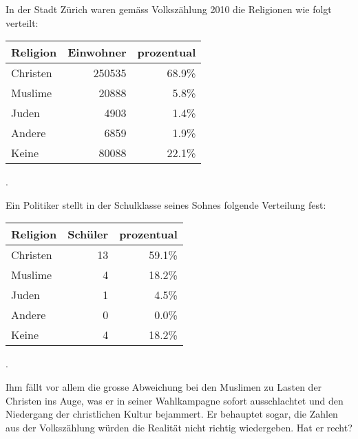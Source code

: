 In der Stadt Zürich waren gemäss Volkszählung 2010 die Religionen
wie folgt verteilt:
\begin{center}
\begin{tabular}{|l|r|r|}
\hline
Religion&Einwohner&prozentual\\
\hline
Christen&   250535&68.9\%\\
Muslime &    20888& 5.8\%\\
Juden   &     4903& 1.4\%\\
Andere  &     6859& 1.9\%\\
Keine   &    80088&22.1\%\\
\hline
\end{tabular}.
\end{center}
Ein Politiker stellt in der Schulklasse seines Sohnes folgende
Verteilung fest:
\begin{center}
\begin{tabular}{|l|r|r|}
\hline
Religion&Schüler&prozentual\\
\hline
Christen&      13&    59.1\%\\
Muslime &       4&    18.2\%\\
Juden   &       1&     4.5\%\\
Andere  &       0&     0.0\%\\
Keine   &       4&    18.2\%\\
\hline
\end{tabular}.
\end{center}
Ihm fällt vor allem die grosse Abweichung bei den Muslimen
zu Lasten der Christen ins Auge, was er in seiner Wahlkampagne
sofort ausschlachtet und den Niedergang der christlichen Kultur
bejammert.
Er behauptet sogar, die Zahlen aus der Volkszählung würden die
Realität nicht richtig wiedergeben. Hat er recht?


